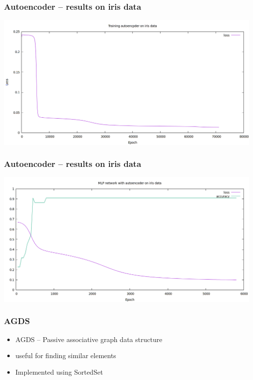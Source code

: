 \documentclass{beamer}
\begin{document}

\begin{frame}
\frametitle{Autoencoder -- results on iris data}
	\includegraphics[height=0.65\textheight]{autoencoder}
\end{frame}

\begin{frame}
\frametitle{Autoencoder -- results on iris data}
	\includegraphics[height=0.65\textheight]{autoencoder_mlp}
\end{frame}


\begin{frame}
\frametitle{AGDS}
\begin{itemize}
	\item AGDS -- Passive associative graph data structure
	\item useful for finding similar elements
	\item Implemented using SortedSet
\end{itemize}
\end{frame}
\end{document}
